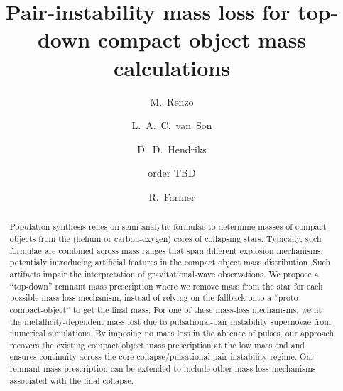 \documentclass[twocolumn]{aastex63}
\begin{document}
\title{Pair-instability mass loss for top-down compact object mass calculations}

\author[0000-0002-6718-9472]{M.~Renzo}


\author[0000-0001-5484-4987]{L.~A.~C.~van~Son}


\author[0000-0002-8717-6046]{D.~D.~Hendriks}

\author{order TBD}

\author[0000-0003-3441-7624]{R.~Farmer}










\begin{abstract}
  \noindent
  Population synthesis relies on semi-analytic formulae to determine
  masses of compact objects from the (helium or carbon-oxygen) cores of
  collapsing stars. Typically, such formulae are combined across mass
  ranges that span different explosion mechanisms, potentialy
  introducing artificial features in the compact object mass
  distribution. Such artifacts impair the interpretation of
  gravitational-wave observations. We propose a
  ``top-down'' remnant mass prescription where we remove mass from the
  star for each possible mass-loss mechanism, instead of relying on the fallback
  onto a ``proto-compact-object'' to get the final mass. For one of these
  mass-loss mechanisms, we fit
  the metallicity-dependent mass lost due to pulsational-pair instability supernovae
  from numerical simulations. By imposing no mass loss in the absence of
  pulses, our approach recovers the existing compact object mass
  prescription at the low mass end and ensures continuity across the
  core-collapse/pulsational-pair-instability regime. Our remnant mass
  prescription can be extended
  to include other mass-loss mechanisms associated with the final collapse.\\
\end{abstract}
\end{document}
